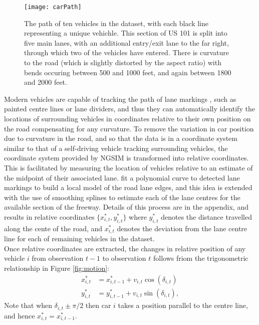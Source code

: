 \documentclass[12pt,a4paper]{article}\usepackage[]{graphicx}\usepackage[]{color}
\begin{document}
\begin{figure}
\centering
\texttt{[image: carPath]}
\caption{The path of ten vehicles in the dataset, with each black line representing a unique vehichle. This section of US 101 is split into five main lanes, with an additional entry/exit lane to the far right, through which two of the vehicles have entered. There is curvature to the road (which is slightly distorted by the aspect ratio) with bends occuring between 500 and 1000 feet, and again between 1800 and 2000 feet.}
\label{fig:rawData}
\end{figure}

Modern vehicles are capable of tracking the path of lane markings \citep{Thuy2010}, such as painted centre lines or lane dividers, and thus they can automatically identify the locations of surrounding vehicles in coordinates relative to their own position on the road compensating for any curvature. To remove the variation in car position due to curvature in the road, and so that the data is in a coordinate system similar to that of a self-driving vehicle tracking surrounding vehicles, the coordinate system provided by NGSIM is transformed into relative coordinates. This is facilitated by measuring the location of vehicles relative to an estimate of the midpoint of their associated lane. \citet{Woo2016a} fit a polynomial curve to detected lane markings to build a local model of the road lane edges, and this idea is extended with the use of smoothing splines to estimate each of the lane centres for the available section of the freeway. Details of this process are in the appendix, and results in relative coordinates $\{x^*_{i, t}, y^*_{i, t}\}$  where $y^*_{i, t}$ denotes the distance travelled along the cente of the road, and $x^*_{i, t}$ denotes the deviation from the lane centre line for each of remaining vehicles in the dataset.
\\

Once relative coordinates are extracted, the changes in relative position of any vehicle $i$ from observation $t-1$ to observation $t$ follows friom the trigonometric relationship in Figure \ref{fig:motion}:
\begin{align}
x^*_{i, t} &= x^*_{i, t-1} + v_{i, t} \cos(\delta_{i, t}) \label{xEq} \\
y^*_{i, t} &= y^*_{i, t-1} + v_{i, t} \sin(\delta_{i, t}) \label{yEq},
\end{align}
Note that when $\delta_{i, t} \pm \pi/2$ then car $i$ takes a position parallel to the centre line, and hence $x^*_{i, t} = x^*_{i, t-1}$.
\\
\end{document}

